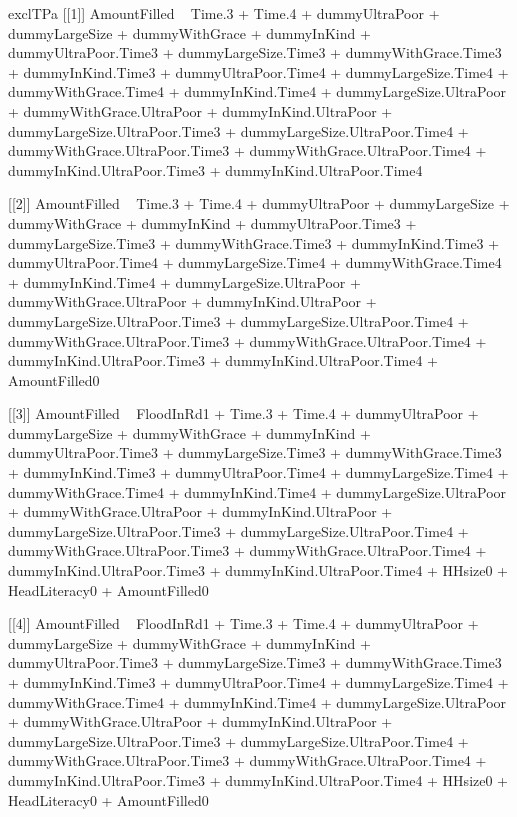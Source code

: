 \begin{Schunk}
\begin{Soutput}
[1] exclTPa
[[1]]
AmountFilled ~ Time.3 + Time.4 + dummyUltraPoor + dummyLargeSize + 
    dummyWithGrace + dummyInKind + dummyUltraPoor.Time3 + dummyLargeSize.Time3 + 
    dummyWithGrace.Time3 + dummyInKind.Time3 + dummyUltraPoor.Time4 + 
    dummyLargeSize.Time4 + dummyWithGrace.Time4 + dummyInKind.Time4 + 
    dummyLargeSize.UltraPoor + dummyWithGrace.UltraPoor + dummyInKind.UltraPoor + 
    dummyLargeSize.UltraPoor.Time3 + dummyLargeSize.UltraPoor.Time4 + 
    dummyWithGrace.UltraPoor.Time3 + dummyWithGrace.UltraPoor.Time4 + 
    dummyInKind.UltraPoor.Time3 + dummyInKind.UltraPoor.Time4

[[2]]
AmountFilled ~ Time.3 + Time.4 + dummyUltraPoor + dummyLargeSize + 
    dummyWithGrace + dummyInKind + dummyUltraPoor.Time3 + dummyLargeSize.Time3 + 
    dummyWithGrace.Time3 + dummyInKind.Time3 + dummyUltraPoor.Time4 + 
    dummyLargeSize.Time4 + dummyWithGrace.Time4 + dummyInKind.Time4 + 
    dummyLargeSize.UltraPoor + dummyWithGrace.UltraPoor + dummyInKind.UltraPoor + 
    dummyLargeSize.UltraPoor.Time3 + dummyLargeSize.UltraPoor.Time4 + 
    dummyWithGrace.UltraPoor.Time3 + dummyWithGrace.UltraPoor.Time4 + 
    dummyInKind.UltraPoor.Time3 + dummyInKind.UltraPoor.Time4 + 
    AmountFilled0

[[3]]
AmountFilled ~ FloodInRd1 + Time.3 + Time.4 + dummyUltraPoor + 
    dummyLargeSize + dummyWithGrace + dummyInKind + dummyUltraPoor.Time3 + 
    dummyLargeSize.Time3 + dummyWithGrace.Time3 + dummyInKind.Time3 + 
    dummyUltraPoor.Time4 + dummyLargeSize.Time4 + dummyWithGrace.Time4 + 
    dummyInKind.Time4 + dummyLargeSize.UltraPoor + dummyWithGrace.UltraPoor + 
    dummyInKind.UltraPoor + dummyLargeSize.UltraPoor.Time3 + 
    dummyLargeSize.UltraPoor.Time4 + dummyWithGrace.UltraPoor.Time3 + 
    dummyWithGrace.UltraPoor.Time4 + dummyInKind.UltraPoor.Time3 + 
    dummyInKind.UltraPoor.Time4 + HHsize0 + HeadLiteracy0 + AmountFilled0

[[4]]
AmountFilled ~ FloodInRd1 + Time.3 + Time.4 + dummyUltraPoor + 
    dummyLargeSize + dummyWithGrace + dummyInKind + dummyUltraPoor.Time3 + 
    dummyLargeSize.Time3 + dummyWithGrace.Time3 + dummyInKind.Time3 + 
    dummyUltraPoor.Time4 + dummyLargeSize.Time4 + dummyWithGrace.Time4 + 
    dummyInKind.Time4 + dummyLargeSize.UltraPoor + dummyWithGrace.UltraPoor + 
    dummyInKind.UltraPoor + dummyLargeSize.UltraPoor.Time3 + 
    dummyLargeSize.UltraPoor.Time4 + dummyWithGrace.UltraPoor.Time3 + 
    dummyWithGrace.UltraPoor.Time4 + dummyInKind.UltraPoor.Time3 + 
    dummyInKind.UltraPoor.Time4 + HHsize0 + HeadLiteracy0 + AmountFilled0


\end{Soutput}
\end{Schunk}
